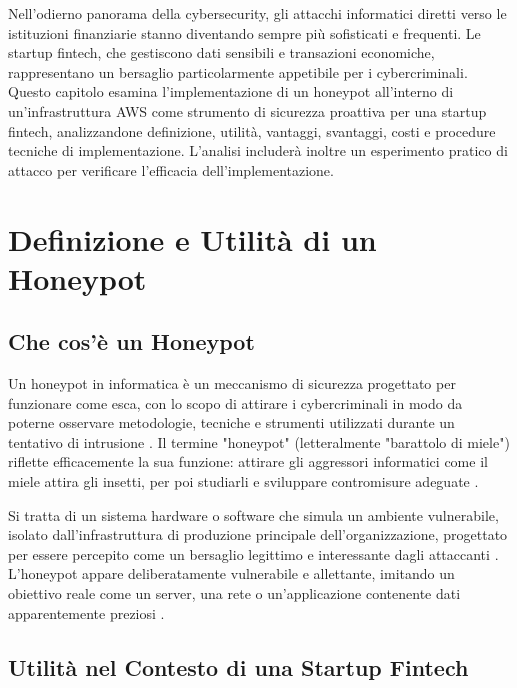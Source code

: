 Nell'odierno panorama della cybersecurity, gli attacchi informatici diretti verso le istituzioni finanziarie stanno diventando sempre più sofisticati e frequenti. Le startup fintech, che gestiscono dati sensibili e transazioni economiche, rappresentano un bersaglio particolarmente appetibile per i cybercriminali. Questo capitolo esamina l'implementazione di un honeypot all'interno di un'infrastruttura AWS come strumento di sicurezza proattiva per una startup fintech, analizzandone definizione, utilità, vantaggi, svantaggi, costi e procedure tecniche di implementazione. L'analisi includerà inoltre un esperimento pratico di attacco per verificare l'efficacia dell'implementazione.

\section{Definizione e Utilità di un Honeypot}
\label{sec:def_utilita}

\subsection{Che cos'è un Honeypot}
\label{subsec:cos_e_honeypot}

Un honeypot in informatica è un meccanismo di sicurezza progettato per funzionare come esca, con lo scopo di attirare i cybercriminali in modo da poterne osservare metodologie, tecniche e strumenti utilizzati durante un tentativo di intrusione \cite{proofpoint2024}. Il termine "honeypot" (letteralmente "barattolo di miele") riflette efficacemente la sua funzione: attirare gli aggressori informatici come il miele attira gli insetti, per poi studiarli e sviluppare contromisure adeguate \cite{universeit2021}.

Si tratta di un sistema hardware o software che simula un ambiente vulnerabile, isolato dall'infrastruttura di produzione principale dell'organizzazione, progettato per essere percepito come un bersaglio legittimo e interessante dagli attaccanti \cite{insic2023, perego_2023}. L'honeypot appare deliberatamente vulnerabile e allettante, imitando un obiettivo reale come un server, una rete o un'applicazione contenente dati apparentemente preziosi \cite{proofpoint2024, vienažindytė_2020}.

\subsection{Utilità nel Contesto di una Startup Fintech}
\label{subsec:utilita_fintech}

